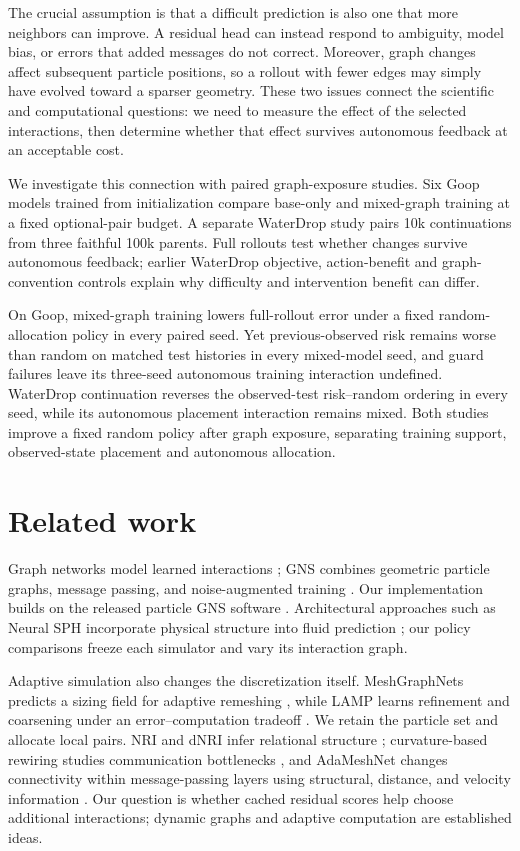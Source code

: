The crucial assumption is that a difficult prediction is also one that more neighbors can improve. A residual head can instead respond to ambiguity, model bias, or errors that added messages do not correct. Moreover, graph changes affect subsequent particle positions, so a rollout with fewer edges may simply have evolved toward a sparser geometry. These two issues connect the scientific and computational questions: we need to measure the effect of the selected interactions, then determine whether that effect survives autonomous feedback at an acceptable cost.

We investigate this connection with paired graph-exposure studies. Six Goop models trained from initialization compare base-only and mixed-graph training at a fixed optional-pair budget. A separate WaterDrop study pairs 10k continuations from three faithful 100k parents. Full rollouts test whether changes survive autonomous feedback; earlier WaterDrop objective, action-benefit and graph-convention controls explain why difficulty and intervention benefit can differ.

On Goop, mixed-graph training lowers full-rollout error under a fixed random-allocation policy in every paired seed. Yet previous-observed risk remains worse than random on matched test histories in every mixed-model seed, and guard failures leave its three-seed autonomous training interaction undefined. WaterDrop continuation reverses the observed-test risk--random ordering in every seed, while its autonomous placement interaction remains mixed. Both studies improve a fixed random policy after graph exposure, separating training support, observed-state placement and autonomous allocation.

\section{Related work}
Graph networks model learned interactions \citep{battaglia2016}; GNS combines geometric particle graphs, message passing, and noise-augmented training \citep{sanchez2020}. Our implementation builds on the released particle GNS software \citep{kumar2023}. Architectural approaches such as Neural SPH incorporate physical structure into fluid prediction \citep{toshev2024}; our policy comparisons freeze each simulator and vary its interaction graph.

Adaptive simulation also changes the discretization itself. MeshGraphNets predicts a sizing field for adaptive remeshing \citep{pfaff2021}, while LAMP learns refinement and coarsening under an error--computation tradeoff \citep{wu2023}. We retain the particle set and allocate local pairs. NRI and dNRI infer relational structure \citep{kipf2018,graber2020}; curvature-based rewiring studies communication bottlenecks \citep{topping2022}, and AdaMeshNet changes connectivity within message-passing layers using structural, distance, and velocity information \citep{seo2025}. Our question is whether cached residual scores help choose additional interactions; dynamic graphs and adaptive computation are established ideas.

